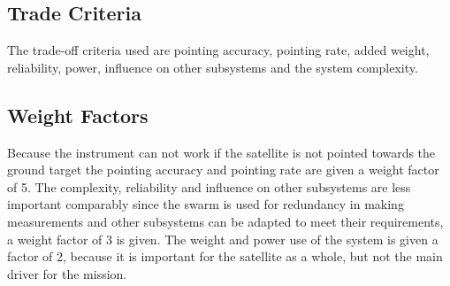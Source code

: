 \subsection{Trade Criteria}
The trade-off criteria used are pointing accuracy, pointing rate, added weight, reliability, power, influence on other subsystems and the system complexity.

\subsection{Weight Factors}
Because the instrument can not work if the satellite is not pointed towards the ground target the pointing accuracy and pointing rate are given a weight factor of 5. The complexity, reliability and influence on other subsystems are less important comparably since the swarm is used for redundancy in making measurements and other subsystems can be adapted to meet their requirements, a weight factor of 3 is given. The weight and power use of the system is given a factor of 2, because it is important for the satellite as a whole, but not the main driver for the mission.

